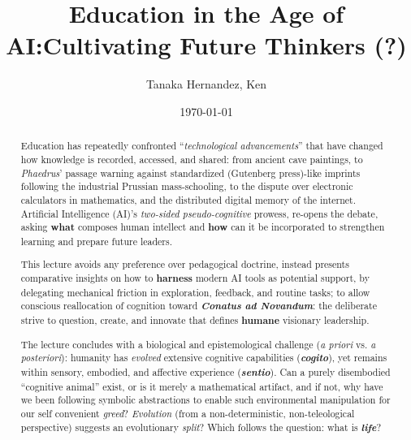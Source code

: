 \documentclass[12pt]{article}
\title{Education in the Age of AI:\break\large Cultivating Future Thinkers (?)}
\author{Tanaka Hernandez, Ken}
\date{\today}
\begin{document}
\maketitle

\begin{abstract}
  Education has repeatedly confronted ``\textit{technological advancements}''
  that have changed how knowledge is recorded, accessed, and shared: from
  ancient cave paintings, to \textit{Phaedrus}' passage warning against
  standardized (Gutenberg press)-like imprints following the industrial
  Prussian mass-schooling, to the dispute over electronic calculators in
  mathematics, and the distributed digital memory of the internet. Artificial
  Intelligence (AI)'s \textit{two-sided pseudo-cognitive} prowess, re-opens the
  debate, asking \textbf{what} composes human intellect and \textbf{how} can it
  be incorporated to strengthen learning and prepare future leaders.

  This lecture avoids any preference over pedagogical doctrine, instead
  presents comparative insights on how to \textbf{harness} modern AI tools as
  potential support, by delegating mechanical friction in exploration,
  feedback, and routine tasks; to allow conscious reallocation of cognition
  toward \textbf{\textit{Conatus ad Novandum}}: the deliberate strive to
  question, create, and innovate that defines \textbf{humane} visionary
  leadership.

  The lecture concludes with a biological and epistemological challenge
  (\textit{a priori} vs. \textit{a posteriori}): humanity has \textit{evolved}
  extensive cognitive capabilities (\textbf{\textit{cogito}}), yet remains
  within sensory, embodied, and affective experience
  (\textbf{\textit{sentio}}). Can a purely disembodied ``cognitive animal''
  exist, or is it merely a mathematical artifact, and if not, why have we been
  following symbolic abstractions to enable such environmental manipulation for
  our self convenient \textit{greed}? \textit{Evolution} (from a
  non-deterministic, non-teleological perspective) suggests an evolutionary
  \textit{split}? Which follows the question: what is \textbf{\textit{life}}?
\end{abstract}
\end{document}
